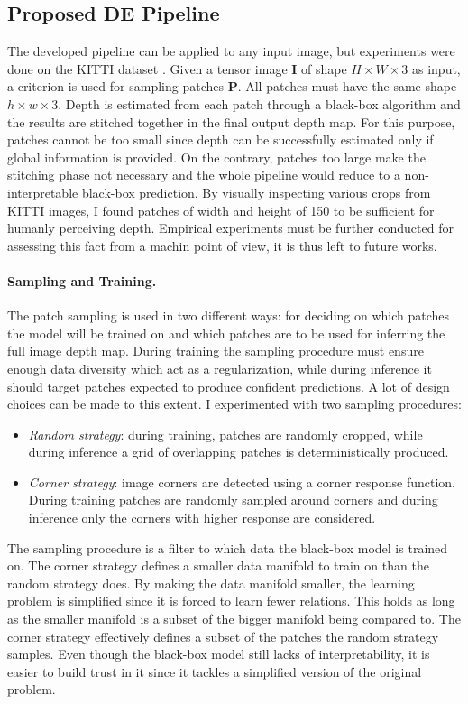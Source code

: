 \subsection{Proposed DE Pipeline}
The developed pipeline can be applied to any input image, but experiments were done on the KITTI dataset \cite{KITTI}.
Given a tensor image $\mathbf{I}$ of shape $H \times W \times 3$ as input, a criterion is used for sampling patches $\mathbf{P}$.
All patches must have the same shape $h \times w \times 3$.
Depth is estimated from each patch through a black-box algorithm and the results are stitched together in the final output depth map.
For this purpose, patches cannot be too small since depth can be successfully estimated only if global information is provided.
On the contrary, patches too large make the stitching phase not necessary and the whole pipeline would reduce to a non-interpretable black-box prediction.
By visually inspecting various crops from KITTI images, I found patches of width and height of 150 to be sufficient for humanly perceiving depth.
Empirical experiments must be further conducted for assessing this fact from a machin point of view, it is thus left to future works.

\vfill

\paragraph{Sampling and Training.}
The patch sampling is used in two different ways: for deciding on which patches the model will be trained on and which patches are to be used for inferring the full image depth map. 
During training the sampling procedure must ensure enough data diversity which act as a regularization, while during inference it should target patches expected to produce confident predictions.
A lot of design choices can be made to this extent.
I experimented with two sampling procedures:
\begin{itemize}
    \item{
        \textit{Random strategy}: during training, patches are randomly cropped, while during inference a grid of overlapping patches is deterministically produced.}
    \item{
        \textit{Corner strategy}: image corners are detected using a corner response function.
        During training patches are randomly sampled around corners and during inference only the corners with higher response are considered.
    }
\end{itemize}
The sampling procedure is a filter to which data the black-box model is trained on.
The corner strategy defines a smaller data manifold to train on than the random strategy does.
By making the data manifold smaller, the learning problem is simplified since it is forced to learn fewer relations.
This holds as long as the smaller manifold is a subset of the bigger manifold being compared to.
The corner strategy effectively defines a subset of the patches the random strategy samples.
Even though the black-box model still lacks of interpretability, it is easier to build trust in it since it tackles a simplified version of the original problem. 

